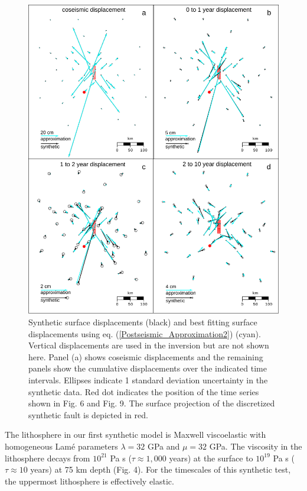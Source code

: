 \documentclass[extra,mreferee]{gji}
\begin{document}
\begin{figure}\label{figure5}
  \centering
  \includegraphics{figures/Fig5.pdf}
  \caption{Synthetic surface displacements (black) and best fitting
    surface displacements using eq. (\ref{Postseismic_Approximation2})
    (cyan).  Vertical displacements are used in the inversion but are
    not shown here. Panel (a) shows coseismic displacements
    and the remaining panels show the cumulative displacements over
    the indicated time intervals. Ellipses indicate 1 standard
    deviation uncertainty in the synthetic data. Red dot indicates the
    position of the time series shown in Fig. 6 and Fig. 9. The surface
    projection of the discretized synthetic fault is depicted in red.}
  \label{Figure 5}
\end{figure}

The lithosphere in our first synthetic model is Maxwell viscoelastic
with homogeneous Lam\'e parameters $\lambda = 32$ GPa and $\mu = 32$
GPa.  The viscosity in the lithosphere decays from $10^{21}$ Pa s
($\tau\approx1,000$ years) at the surface to $10^{19}$ Pa s
($\tau\approx10$ years) at 75 km depth (Fig. 4).  For the timescales
of this synthetic test, the uppermost lithosphere is effectively
elastic.
\end{document}
